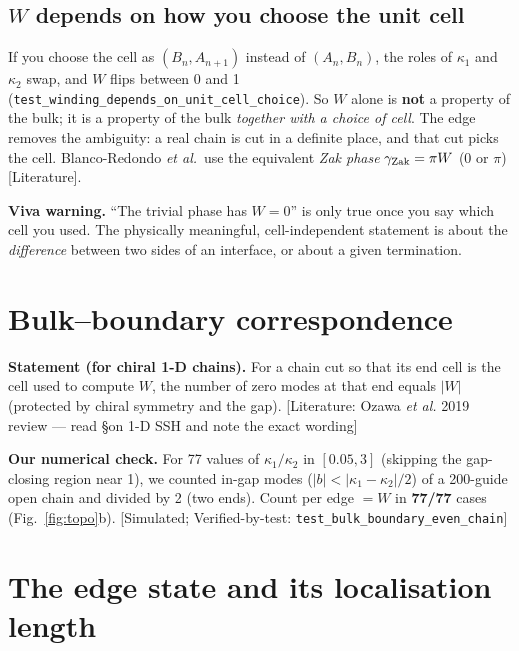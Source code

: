 \documentclass[10pt,a4paper]{article}
\newcommand{\ka}{\kappa_1}
\newcommand{\kc}{\kappa_2}
\newcommand{\note}[1]{\par\smallskip\noindent\colorbox{gray!12}{\parbox{\dimexpr\linewidth-2\fboxsep}{\small #1}}\par\smallskip}
\newcommand{\evd}[1]{\textsf{\small[#1]}}
\begin{document}
\subsection{$W$ depends on how you choose the unit cell}
If you choose the cell as $(B_n,A_{n+1})$ instead of $(A_n,B_n)$, the roles of $\ka$ and $\kc$ swap, and $W$ flips between 0 and 1 (\texttt{test\_winding\_depends\_on\_unit\_cell\_choice}). So $W$ alone is \textbf{not} a property of the bulk; it is a property of the bulk \emph{together with a choice of cell}. The edge removes the ambiguity: a real chain is cut in a definite place, and that cut picks the cell. Blanco-Redondo \emph{et al.}\ use the equivalent \emph{Zak phase} $\gamma_{\rm Zak}=\pi W$ (0 or $\pi$) \evd{Literature}.
\note{\textbf{Viva warning.} ``The trivial phase has $W=0$'' is only true once you say which cell you used. The physically meaningful, cell-independent statement is about the \emph{difference} between two sides of an interface, or about a given termination.}

\section{Bulk--boundary correspondence}
\textbf{Statement (for chiral 1-D chains).} For a chain cut so that its end cell is the cell used to compute $W$, the number of zero modes at that end equals $|W|$ (protected by chiral symmetry and the gap). \evd{Literature: Ozawa \emph{et al.} 2019 review --- read \S on 1-D SSH and note the exact wording}

\textbf{Our numerical check.} For 77 values of $\ka/\kc$ in $[0.05,3]$ (skipping the gap-closing region near 1), we counted in-gap modes ($|b|<|\ka-\kc|/2$) of a 200-guide open chain and divided by 2 (two ends). Count per edge $=W$ in \textbf{77/77} cases (Fig.~\ref{fig:topo}b). \evd{Simulated; Verified-by-test: \texttt{test\_bulk\_boundary\_even\_chain}}

\section{The edge state and its localisation length}
\end{document}
